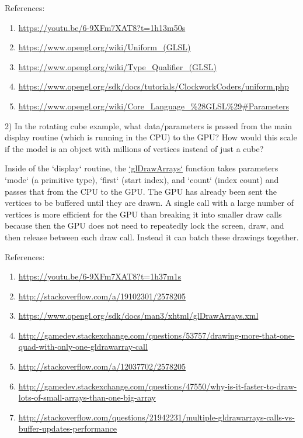 \documentclass[12pt]{article}
\begin{document}
References:
\begin{enumerate}
    \item \url{https://youtu.be/6-9XFm7XAT8?t=1h13m50s}
    \item \url{https://www.opengl.org/wiki/Uniform_(GLSL)}
    \item \url{https://www.opengl.org/wiki/Type_Qualifier_(GLSL)}
    \item \url{https://www.opengl.org/sdk/docs/tutorials/ClockworkCoders/uniform.php}
    \item \url{https://www.opengl.org/wiki/Core_Language_%28GLSL%29#Parameters}
\end{enumerate}


2) In the rotating cube example, what data/parameters is passed from the main display routine (which is running in the CPU) to the GPU? How would this scale if the model is an object with millions of vertices instead of just a cube?

Inside of the `display` routine, the \href{https://www.opengl.org/sdk/docs/man3/xhtml/glDrawArrays.xml}{`glDrawArrays`} function takes parameters `mode` (a primitive type), `first` (start index), and `count` (index count) and passes that from the CPU to the GPU. The GPU has already been sent the vertices to be buffered until they are drawn. A single call with a large number of vertices is more efficient for the GPU than breaking it into smaller draw calls because then the GPU does not need to repeatedly lock the screen, draw, and then release between each draw call. Instead it can batch these drawings together.

References:
\begin{enumerate}
    \item \url{https://youtu.be/6-9XFm7XAT8?t=1h37m1s}
    \item \url{http://stackoverflow.com/a/19102301/2578205}
    \item \url{https://www.opengl.org/sdk/docs/man3/xhtml/glDrawArrays.xml}
    \item \url{http://gamedev.stackexchange.com/questions/53757/drawing-more-that-one-quad-with-only-one-gldrawarray-call}
    \item \url{http://stackoverflow.com/a/12037702/2578205}
    \item \url{http://gamedev.stackexchange.com/questions/47550/why-is-it-faster-to-draw-lots-of-small-arrays-than-one-big-array}
    \item \url{http://stackoverflow.com/questions/21942231/multiple-gldrawarrays-calls-vs-buffer-updates-performance}
\end{enumerate}
\end{document}
